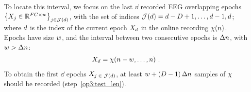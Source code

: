 To locate this interval, we focus on the last $\dd$ recorded EEG overlapping epochs 
$ \left\{ X_{\operatorname{\text{\ensuremath{j}}}} \in \mathbb{R}^{FC \times w} \right\}_{j \in \mathcal{J}(d)} $,
with the set of indices $\mathcal{J}(d) = d-D +1,\ldots,d-1,d$; 
where $d$ is the index of the current epoch $X_{\operatorname{\text{\ensuremath{d}}}}$ in the online recording $\chi(n)$. 
Epochs have size $w$, and the interval between two consecutive epochs is $\Delta n$, with $w > \Delta n $:
\begin{equation}
\label{eq:online_epoch}
 \Xs{\di} = \onlineX(\si-\ws,\ldots,\si) \ .
\end{equation}
To obtain the first $\dd$ epochs $X_{\operatorname{\text{\ensuremath{j \in \mathcal{J}(d)}}}}$, at least $w+(D-1)\,\Delta n$ samples of $\chi$ should be recorded (step~\ref{op3:test_len}).

